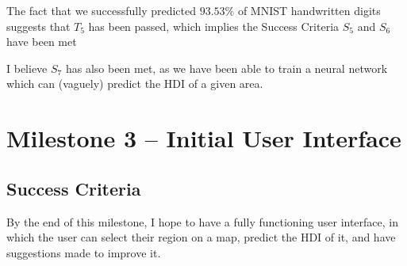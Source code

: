 \documentclass[12pt]{report}
\begin{document}
The fact that we successfully predicted $93.53\%$ of MNIST handwritten digits suggests that $T_{5}$ has been passed, which implies the Success Criteria $S_{5}$ and $S_{6}$ have been met

\begin{center}
\end{center}

I believe $S_{7}$ has also been met, as we have been able to train a neural network which can (vaguely) predict the HDI of a given area.

\section{Milestone 3 -- Initial User Interface}
\subsection{Success Criteria}
By the end of this milestone, I hope to have a fully functioning user interface, in which the user can select their region on a map, predict the HDI of it, and have suggestions made to improve it.
\begin{center}
\end{center}
\end{document}
